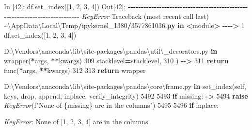 \documentclass[
]{book}
\newenvironment{Shaded}{\begin{snugshade}}{\end{snugshade}}
\newcommand{\ControlFlowTok}[1]{\textcolor[rgb]{0.13,0.29,0.53}{\textbf{#1}}}
\newcommand{\DecValTok}[1]{\textcolor[rgb]{0.00,0.00,0.81}{#1}}
\newcommand{\ErrorTok}[1]{\textcolor[rgb]{0.64,0.00,0.00}{\textbf{#1}}}
\newcommand{\FloatTok}[1]{\textcolor[rgb]{0.00,0.00,0.81}{#1}}
\newcommand{\KeywordTok}[1]{\textcolor[rgb]{0.13,0.29,0.53}{\textbf{#1}}}
\newcommand{\NormalTok}[1]{#1}
\newcommand{\OperatorTok}[1]{\textcolor[rgb]{0.81,0.36,0.00}{\textbf{#1}}}
\newcommand{\PreprocessorTok}[1]{\textcolor[rgb]{0.56,0.35,0.01}{\textit{#1}}}
\newcommand{\SpecialCharTok}[1]{\textcolor[rgb]{0.00,0.00,0.00}{#1}}
\newcommand{\SpecialStringTok}[1]{\textcolor[rgb]{0.31,0.60,0.02}{#1}}
\newcommand{\StringTok}[1]{\textcolor[rgb]{0.31,0.60,0.02}{#1}}
\newcommand{\VariableTok}[1]{\textcolor[rgb]{0.00,0.00,0.00}{#1}}
\begin{document}
\begin{Shaded}
\begin{Highlighting}[]
\NormalTok{In [}\DecValTok{42}\NormalTok{]: df.set\_index([}\DecValTok{1}\NormalTok{, }\DecValTok{2}\NormalTok{, }\DecValTok{3}\NormalTok{, }\DecValTok{4}\NormalTok{])}
\NormalTok{Out[}\DecValTok{42}\NormalTok{]:}
\OperatorTok{{-}{-}{-}{-}{-}{-}{-}{-}{-}{-}{-}{-}{-}{-}{-}{-}{-}{-}{-}{-}{-}{-}{-}{-}{-}{-}{-}{-}{-}{-}{-}{-}{-}{-}{-}{-}{-}{-}{-}{-}{-}{-}{-}{-}{-}{-}{-}{-}{-}{-}{-}{-}{-}{-}{-}{-}{-}{-}{-}{-}{-}{-}{-}{-}{-}{-}{-}{-}{-}{-}{-}{-}{-}{-}{-}}
\PreprocessorTok{KeyError}\NormalTok{                                  Traceback (most recent call last)}
\OperatorTok{\textasciitilde{}}\NormalTok{\textbackslash{}AppData\textbackslash{}Local\textbackslash{}Temp}\OperatorTok{/}\NormalTok{ipykernel\_1380}\OperatorTok{/}\FloatTok{3577861036.}\ErrorTok{py} \KeywordTok{in} \OperatorTok{\textless{}}\NormalTok{module}\OperatorTok{\textgreater{}}
\OperatorTok{{-}{-}{-}{-}\textgreater{}} \DecValTok{1}\NormalTok{ df.set\_index([}\DecValTok{1}\NormalTok{, }\DecValTok{2}\NormalTok{, }\DecValTok{3}\NormalTok{, }\DecValTok{4}\NormalTok{])}

\NormalTok{D:\textbackslash{}Vendors\textbackslash{}anaconda\textbackslash{}lib\textbackslash{}site}\OperatorTok{{-}}\NormalTok{packages\textbackslash{}pandas\textbackslash{}util\textbackslash{}\_decorators.py }\KeywordTok{in}\NormalTok{ wrapper(}\OperatorTok{*}\NormalTok{args, }\OperatorTok{**}\NormalTok{kwargs)}
    \DecValTok{309}\NormalTok{                     stacklevel}\OperatorTok{=}\NormalTok{stacklevel,}
    \DecValTok{310}\NormalTok{                 )}
\OperatorTok{{-}{-}\textgreater{}} \DecValTok{311}             \ControlFlowTok{return}\NormalTok{ func(}\OperatorTok{*}\NormalTok{args, }\OperatorTok{**}\NormalTok{kwargs)}
    \DecValTok{312} 
    \DecValTok{313}         \ControlFlowTok{return}\NormalTok{ wrapper}

\NormalTok{D:\textbackslash{}Vendors\textbackslash{}anaconda\textbackslash{}lib\textbackslash{}site}\OperatorTok{{-}}\NormalTok{packages\textbackslash{}pandas\textbackslash{}core\textbackslash{}frame.py }\KeywordTok{in}\NormalTok{ set\_index(}\VariableTok{self}\NormalTok{, keys, drop, append, inplace, verify\_integrity)}
   \DecValTok{5492} 
   \DecValTok{5493}         \ControlFlowTok{if}\NormalTok{ missing:}
\OperatorTok{{-}\textgreater{}} \DecValTok{5494}             \ControlFlowTok{raise} \PreprocessorTok{KeyError}\NormalTok{(}\SpecialStringTok{f"None of }\SpecialCharTok{\{}\NormalTok{missing}\SpecialCharTok{\}}\SpecialStringTok{ are in the columns"}\NormalTok{)}
   \DecValTok{5495} 
   \DecValTok{5496}         \ControlFlowTok{if}\NormalTok{ inplace:}

\PreprocessorTok{KeyError}\NormalTok{: }\StringTok{\textquotesingle{}None of [1, 2, 3, 4] are in the columns\textquotesingle{}}
\end{Highlighting}
\end{Shaded}
\end{document}

